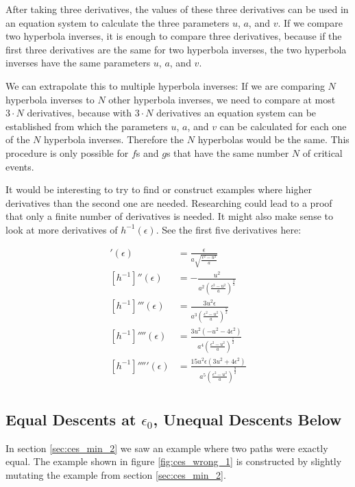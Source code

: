After taking three derivatives, the values of these three derivatives can be used in an equation system to calculate the three parameters $u$, $a$, and $v$. If we compare two hyperbola inverses, it is enough to compare three derivatives, because if the first three derivatives are the same for two hyperbola inverses, the two hyperbola inverses have the same parameters $u$, $a$, and $v$.

We can extrapolate this to multiple hyperbola inverses: If we are comparing $N$ hyperbola inverses to $N$ other hyperbola inverses, we need to compare at most $3\cdot N$ derivatives, because with $3\cdot N$ derivatives an equation system can be established from which the parameters $u$, $a$, and $v$ can be calculated for each one of the $N$ hyperbola inverses. Therefore the $N$ hyperbolas would be the same. This procedure is only possible for $f$s and $g$s that have the same number $N$ of critical events.

It would be interesting to try to find or construct examples where higher derivatives than the second one are needed. Researching could lead to a proof that only a finite number of derivatives is needed. It might also make sense to look at more derivatives of $h^{-1}(\epsilon)$. See the first five derivatives here:

\begin{align*}
	[h^{-1}]'(\epsilon) &= \frac{ \epsilon }{ a\sqrt{\frac{\epsilon^2 - u^2}{a}} }\\
	[h^{-1}]''(\epsilon) &= -\frac{u^2}{a^2\left(\frac{\epsilon^2 - u^2}{a}\right)^{\frac{3}{2}}}\\
	[h^{-1}]'''(\epsilon) &= \frac{3u^2\epsilon}{a^3\left(\frac{\epsilon^2 - u^2}{a}\right)^{\frac{5}{2}}}\\
	[h^{-1}]''''(\epsilon) &= \frac{3u^2\left(-u^2-4\epsilon^2\right)}{a^4\left(\frac{\epsilon^2 - u^2}{a}\right)^{\frac{7}{2}}}\\
	[h^{-1}]'''''(\epsilon) &= \frac{15u^2\epsilon\left(3u^2+4\epsilon^2\right)}{a^5\left(\frac{\epsilon^2 - u^2}{a}\right)^{\frac{9}{2}}}\\
\end{align*}

	
\subsection{Equal Descents at $\epsilon_0$, Unequal Descents Below}

In section \ref{sec:ces_min_2} we saw an example where two paths were exactly equal. The example shown in figure \ref{fig:ces_wrong_1} is constructed by slightly mutating the example from section \ref{sec:ces_min_2}.

